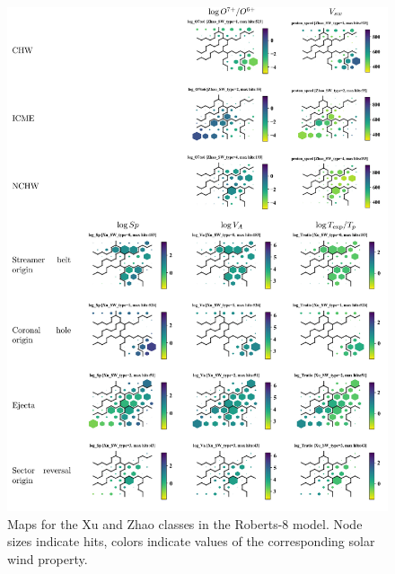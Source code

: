 \documentclass[utf8]{frontiersSCNS} %
\begin{document}
\begin{figure}[h!]\centering
	\includegraphics[width=16cm]{SWtXuRoberts}
	\caption{Maps for the Xu and Zhao classes in the Roberts-8 model. Node sizes indicate hits, colors indicate values of the corresponding solar wind property.}\label{fig:SWtXuRoberts}
\end{figure}


\end{document}
